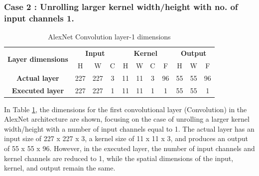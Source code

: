 \subsubsection{Case 2 : Unrolling larger kernel width/height with no. of input channels 1.}

\begin{table}[H]
\centering
\caption{AlexNet Convolution layer-1 dimensions}
\label{tab:unrollConvolutionCase2Dim}
 \begin{tabular}{|c|c|c|c|c|c|c|c|c|c|c|} \hline  
 
 \multirow{2}{*}{\textbf{Layer dimensions}} &  
 \multicolumn{3}{|c|}{\textbf{Input}} &  
 \multicolumn{4}{|c|}{\textbf{Kernel}} &  
 \multicolumn{3}{|c|}{\textbf{Output}}\\ \cline{2-11}
 & H &  W &  C&  H &  W &  C &  F &  H &  W & F\\ \hline  
 \textbf{Actual layer} &  227 &  227 &  3 & 11 & 11 & 3 & 96 & 55 & 55 & 96\\ \hline 
 \textbf{Executed layer} &  227 &  227 &  \cellcolor{yellow}1 & 11 & 11 & \cellcolor{yellow}1 & \cellcolor{yellow}1 & 55 & 55 & \cellcolor{yellow}1 \\ \hline 
 \end{tabular}
\end{table}

In Table \ref{tab:unrollConvolutionCase2Dim}, the dimensions for the first convolutional layer (Convolution) in the AlexNet architecture are shown, focusing on the case of unrolling a larger kernel width/height with a number of input channels equal to 1. The actual layer has an input size of 227 x 227 x 3, a kernel size of 11 x 11 x 3, and produces an output of 55 x 55 x 96. However, in the executed layer, the number of input channels and kernel channels are reduced to 1, while the spatial dimensions of the input, kernel, and output remain the same.

